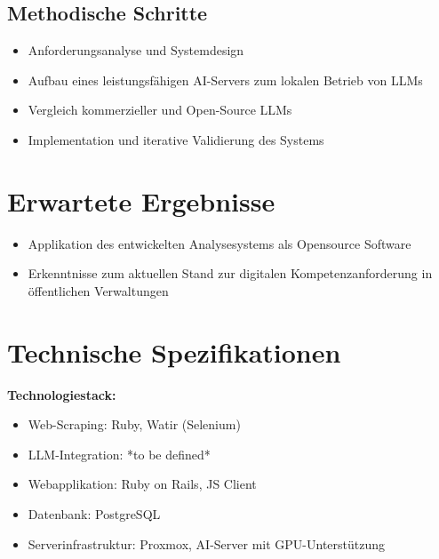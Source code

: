 \documentclass{article}
\begin{document}
\subsection{Methodische Schritte}
\begin{itemize}
	\item Anforderungsanalyse und Systemdesign
	\item Aufbau eines leistungsfähigen AI-Servers zum lokalen Betrieb von LLMs
	\item Vergleich kommerzieller und Open-Source LLMs
	\item Implementation und iterative Validierung des Systems
\end{itemize}

\section{Erwartete Ergebnisse}
\begin{itemize}
	\item Applikation des entwickelten Analysesystems als Opensource Software
	\item Erkenntnisse zum aktuellen Stand zur digitalen Kompetenzanforderung in öffentlichen Verwaltungen
\end{itemize}

\section{Technische Spezifikationen}
\textbf{Technologiestack:}
\begin{itemize}
	\item Web-Scraping: Ruby, Watir (Selenium)
	\item LLM-Integration: *to be defined*
	\item Webapplikation: Ruby on Rails, JS Client
	\item Datenbank: PostgreSQL
	\item Serverinfrastruktur: Proxmox, AI-Server mit GPU-Unterstützung
\end{itemize}

\clearpage
\end{document}
